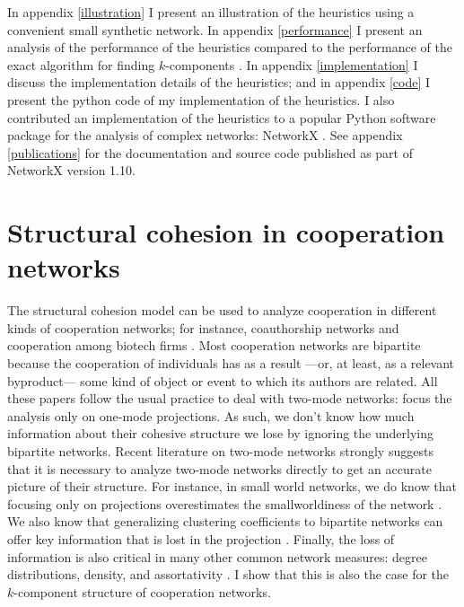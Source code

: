 In appendix \ref{illustration} I present an illustration of the heuristics using a convenient small synthetic network. In appendix \ref{performance} I present an analysis of the performance of the heuristics compared to the performance of the exact algorithm for finding $k$-components \citep{moody:2003}. In appendix \ref{implementation} I discuss the implementation details of the heuristics; and in appendix \ref{code} I present the python code of my implementation of the heuristics. I also contributed an implementation of the heuristics to a popular Python software package for the analysis of complex networks: NetworkX \citep{hagberg:2008}. See appendix \ref{publications} for the documentation and source code published as part of NetworkX version 1.10.

\section{Structural cohesion in cooperation networks}

The structural cohesion model can be used to analyze cooperation in different kinds of cooperation networks; for instance, coauthorship networks \citep{moody:2004, white:2004} and cooperation among biotech firms \citep{powell:2005}. Most cooperation networks are bipartite because the cooperation of individuals has as a result ---or, at least, as a relevant byproduct--- some kind of object or event to which its authors are related. All these papers follow the usual practice to deal with two-mode networks: focus the analysis only on one-mode projections. As such, we don't know how much information about their cohesive structure we lose by ignoring the underlying bipartite networks. Recent literature on two-mode networks strongly suggests that it is necessary to analyze two-mode networks directly to get an accurate picture of their structure. For instance, in small world networks, we do know that focusing only on projections overestimates the smallworldiness of the network \citep{uzzi:2007}. We also know that generalizing clustering coefficients to bipartite networks can offer key information that is lost in the projection  \citep{robins:2004,lind:2005,opsahl:2011}. Finally, the loss of information is also critical in many other common network measures: degree distributions, density, and assortativity \citep{latapy:2008}. I show that this is also the case for the $k$-component structure of cooperation networks.


